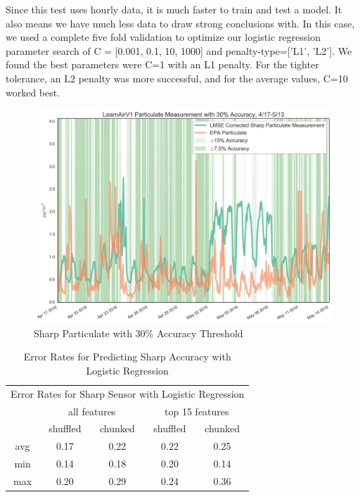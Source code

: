 Since this test uses hourly data, it is much faster to train and test a model.  It also means we have much less data to draw strong conclusions with.  In this case, we used a complete five fold validation to optimize our logistic regression parameter search of C = [0.001, 0.1, 10, 1000] and penalty-type=['L1', 'L2'].  We found the best parameters were C=1 with an L1 penalty.  For the tighter tolerance, an L2 penalty was more successful, and for the average values, C=10 worked best.

\begin{figure}[htb]
 	\includegraphics[width=\textwidth]{figs/sharpDust_with_accuracy_zoomed}               
 	 \caption{Sharp Particulate with 30\% Accuracy Threshold}
  	\label{fig:sharpDust_with_accuracy_zoomed}
\end{figure}

\begin{table}[]
\centering
\begin{tabular}{|c|c|c|c|c|}
\toprule
\multicolumn{5}{|c|}{Error Rates for Sharp Sensor with Logistic Regression} \\
&\multicolumn{2}{|c|}{all features} & \multicolumn{2}{|c|}{top 15 features} \\
&shuffled & chunked & shuffled & chunked \\
avg & 0.17 & 0.22 & 0.22 & 0.25 \\
min & 0.14 & 0.18 & 0.20 & 0.14 \\
max & 0.20 & 0.29 & 0.24 & 0.36 \\
\bottomrule
\end{tabular}
\label{tab:sharp_error_rates}
\caption{Error Rates for Predicting Sharp Accuracy with Logistic Regression}
\end{table}

